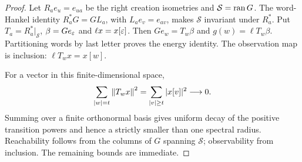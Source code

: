 \begin{proof}
Let $R_ae_u=e_{ua}$ be the right creation isometries and $\mathcal S=\operatorname{ran} G$. The word-Hankel identity $R_a^*G=GL_a$, with $L_ae_v=e_{av}$, makes $\mathcal S$ invariant under $R_a^*$. Put $T_a=R_a^*|_{\mathcal S}$, $\beta=Ge_\varepsilon$ and $\ell x=x[\varepsilon]$. Then $G e_w=T_w\beta$ and $g(w)=\ell T_w\beta$. Partitioning words by last letter proves the energy identity. The observation map is inclusion: $\ell T_wx=x[w]$.

For a vector in this finite-dimensional space,
\[
\sum_{|w|=t}\left\lVert T_wx\right\rVert^2=\sum_{|v|\ge t}|x[v]|^2\longrightarrow0.
\]
Summing over a finite orthonormal basis gives uniform decay of the positive transition powers and hence a strictly smaller than one spectral radius. Reachability follows from the columns of $G$ spanning $\mathcal S$; observability from inclusion. The remaining bounds are immediate.
\end{proof}
